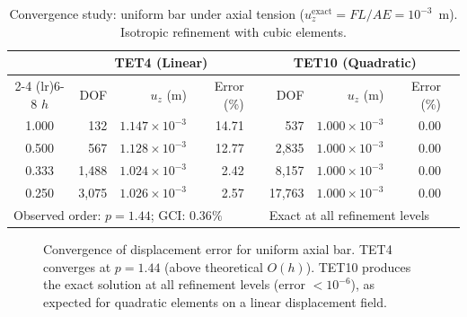 \documentclass[journal]{IEEEtran}
\begin{document}
\begin{table}[t]
  \centering
  \caption{Convergence study: uniform bar under axial tension
    ($u_z^{\text{exact}} = FL/AE = 10^{-3}$~m). Isotropic refinement with
    cubic elements.}
  \label{tab:convergence}
  \begin{tabular}{@{}crrrcrrrr@{}}
    \toprule
    & \multicolumn{3}{c}{TET4 (Linear)} & &
      \multicolumn{3}{c}{TET10 (Quadratic)} \\
    \cmidrule(lr){2-4} \cmidrule(lr){6-8}
    $h$ & DOF & $u_z$ (m) & Error (\%) & & DOF & $u_z$ (m) & Error (\%) \\
    \midrule
    1.000 & 132   & $1.147 \times 10^{-3}$ & 14.71 & &
              537   & $1.000 \times 10^{-3}$ & 0.00 \\
    0.500 & 567   & $1.128 \times 10^{-3}$ & 12.77 & &
            2,835   & $1.000 \times 10^{-3}$ & 0.00 \\
    0.333 & 1,488 & $1.024 \times 10^{-3}$ &  2.42 & &
            8,157   & $1.000 \times 10^{-3}$ & 0.00 \\
    0.250 & 3,075 & $1.026 \times 10^{-3}$ &  2.57 & &
           17,763   & $1.000 \times 10^{-3}$ & 0.00 \\
    \midrule
    \multicolumn{4}{l}{Observed order: $p = 1.44$; GCI: $0.36\%$} & &
    \multicolumn{3}{l}{Exact at all refinement levels} \\
    \bottomrule
  \end{tabular}
\end{table}

\begin{figure}[t]
  \centering
  \caption{Convergence of displacement error for uniform axial bar.
    TET4 converges at $p = 1.44$ (above theoretical $O(h)$). TET10
    produces the exact solution at all refinement levels (error
    $< 10^{-6}$), as expected for quadratic elements on a linear
    displacement field.}
  \label{fig:convergence}
\end{figure}
\end{document}
